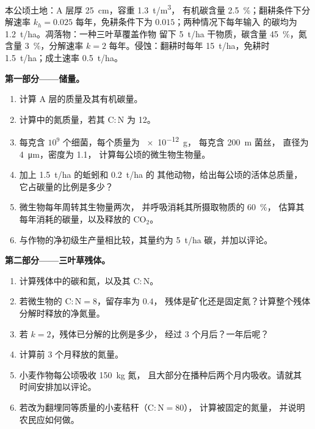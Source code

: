 \begin{problem}
\label{pb:b2:living-soil:1}
本公顷土地：A 层厚 \qty{25}{cm}，容重 \qty{1.3}{t/m^3}，
有机碳含量 \qty{2.5}{\%}；翻耕条件下分解速率 $k_h =
0.025$ 每年，免耕条件下为 $0.015$；两种情况下每年输入
的碳均为 \qty{1.2}{t/ha}。凋落物：一种三叶草覆盖作物
留下 \qty{5}{t/ha} 干物质，碳含量 \qty{45}{\%}，氮含量
\qty{3}{\%}，分解速率 $k = 2$ 每年。侵蚀：翻耕时每年
\qty{15}{t/ha}，免耕时 \qty{1.5}{t/ha}；成土速率
\qty{0.5}{t/ha}。

\medskip
\noindent\textbf{第一部分——储量。}
\begin{enumerate}
  \item 计算 A 层的质量及其有机碳量。
  \item 计算中的氮质量，若其
        $\mathrm{C:N}$ 为 12。
  \item {}每克含 $10^{9}$ 个细菌，每个质量为 \qty{e-12}{g}，
        每克含 \qty{200}{m} 菌丝，
        直径为 \qty{4}{\micro m}，密度为 1.1，
        计算每公顷的微生物生物量。
  \item 加上 \qty{1.5}{t/ha} 的蚯蚓和 \qty{0.2}{t/ha} 的
        其他动物，给出每公顷的活体总质量，
        它占碳量的比例是多少？
  \item 微生物每年周转其生物量两次，
        并呼吸消耗其所摄取物质的 \qty{60}{\%}，
        估算其每年消耗的碳量，以及释放的 $\mathrm{CO_2}$。
  \item 与作物的净初级生产量相比较，其量约为
        \qty{5}{t/ha} 碳，并加以评论。
\end{enumerate}

\medskip
\noindent\textbf{第二部分——三叶草残体。}
\begin{enumerate}[resume]
  \item 计算残体中的碳和氮，以及其
        $\mathrm{C:N}$。
  \item 若微生物的 $\mathrm{C:N} = 8$，留存率为 $0.4$，
        残体是矿化还是固定氮？计算整个残体
        分解时释放的净氮量。
  \item 若 $k = 2$，残体已分解的比例是多少，
        经过 3 个月后？一年后呢？
  \item 计算前 3 个月释放的氮量。
  \item 小麦作物每公顷吸收 \qty{150}{kg} 氮，
        且大部分在播种后两个月内吸收。请就其
        时间安排加以评论。
  \item 若改为翻埋同等质量的小麦秸秆（$\mathrm{C:N} = 80$），
        计算被固定的氮量，
        并说明农民应如何做。
\end{enumerate}


\end{problem}
